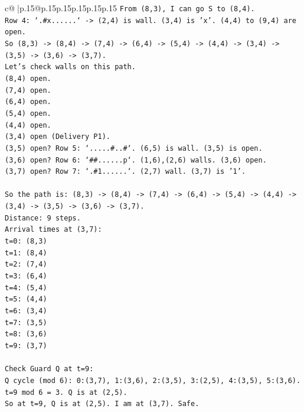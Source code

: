 \documentclass{article}
\begin{document}
{\begin{supertabular}{c@{$\;$}|p{.15\linewidth}@{}p{.15\linewidth}p{.15\linewidth}p{.15\linewidth}p{.15\linewidth}p{.15\linewidth}}
{{{\texttt{From (8,3), I can go S to (8,4).} \\
\texttt{Row 4: `.\#x......` {-}> (2,4) is wall. (3,4) is 'x'. (4,4) to (9,4) are open.} \\
\texttt{So (8,3) {-}> (8,4) {-}> (7,4) {-}> (6,4) {-}> (5,4) {-}> (4,4) {-}> (3,4) {-}> (3,5) {-}> (3,6) {-}> (3,7).} \\
\texttt{Let's check walls on this path.} \\
\texttt{(8,4) open.} \\
\texttt{(7,4) open.} \\
\texttt{(6,4) open.} \\
\texttt{(5,4) open.} \\
\texttt{(4,4) open.} \\
\texttt{(3,4) open (Delivery P1).} \\
\texttt{(3,5) open? Row 5: `.....\#..\#`. (6,5) is wall. (3,5) is open.} \\
\texttt{(3,6) open? Row 6: `\#\#......p`. (1,6),(2,6) walls. (3,6) open.} \\
\texttt{(3,7) open? Row 7: `.\#1......`. (2,7) wall. (3,7) is '1'.} \\
\\ 
\texttt{So the path is: (8,3) {-}> (8,4) {-}> (7,4) {-}> (6,4) {-}> (5,4) {-}> (4,4) {-}> (3,4) {-}> (3,5) {-}> (3,6) {-}> (3,7).} \\
\texttt{Distance: 9 steps.} \\
\texttt{Arrival times at (3,7):} \\
\texttt{t=0: (8,3)} \\
\texttt{t=1: (8,4)} \\
\texttt{t=2: (7,4)} \\
\texttt{t=3: (6,4)} \\
\texttt{t=4: (5,4)} \\
\texttt{t=5: (4,4)} \\
\texttt{t=6: (3,4)} \\
\texttt{t=7: (3,5)} \\
\texttt{t=8: (3,6)} \\
\texttt{t=9: (3,7)} \\
\\ 
\texttt{Check Guard Q at t=9:} \\
\texttt{Q cycle (mod 6): 0:(3,7), 1:(3,6), 2:(3,5), 3:(2,5), 4:(3,5), 5:(3,6).} \\
\texttt{t=9 mod 6 = 3. Q is at (2,5).} \\
\texttt{So at t=9, Q is at (2,5). I am at (3,7). Safe.} \\
}}}
\end{supertabular}}
\end{document}
